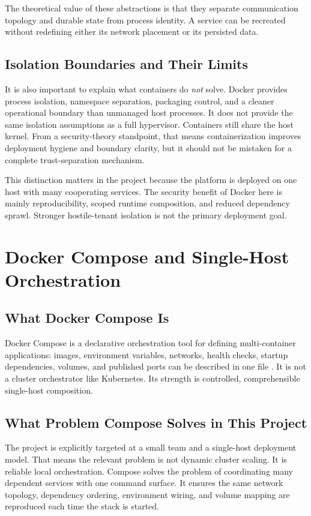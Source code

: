 The theoretical value of these abstractions is that they separate communication topology and durable state from process identity. A service can be recreated without redefining either its network placement or its persisted data.

\subsection{Isolation Boundaries and Their Limits}
It is also important to explain what containers do \emph{not} solve. Docker provides process isolation, namespace separation, packaging control, and a cleaner operational boundary than unmanaged host processes. It does not provide the same isolation assumptions as a full hypervisor. Containers still share the host kernel. From a security-theory standpoint, that means containerization improves deployment hygiene and boundary clarity, but it should not be mistaken for a complete trust-separation mechanism.

This distinction matters in the project because the platform is deployed on one host with many cooperating services. The security benefit of Docker here is mainly reproducibility, scoped runtime composition, and reduced dependency sprawl. Stronger hostile-tenant isolation is not the primary deployment goal.

\section{Docker Compose and Single-Host Orchestration}
\subsection{What Docker Compose Is}
Docker Compose is a declarative orchestration tool for defining multi-container applications: images, environment variables, networks, health checks, startup dependencies, volumes, and published ports can be described in one file \cite{docker_compose_docs}. It is not a cluster orchestrator like Kubernetes. Its strength is controlled, comprehensible single-host composition.

\subsection{What Problem Compose Solves in This Project}
The project is explicitly targeted at a small team and a single-host deployment model. That means the relevant problem is not dynamic cluster scaling. It is reliable local orchestration. Compose solves the problem of coordinating many dependent services with one command surface. It ensures the same network topology, dependency ordering, environment wiring, and volume mapping are reproduced each time the stack is started.

